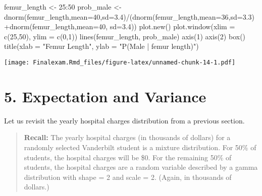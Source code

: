 \documentclass[
]{article}
\newenvironment{Shaded}{\begin{snugshade}}{\end{snugshade}}
\newcommand{\AttributeTok}[1]{\textcolor[rgb]{0.77,0.63,0.00}{#1}}
\newcommand{\DecValTok}[1]{\textcolor[rgb]{0.00,0.00,0.81}{#1}}
\newcommand{\FloatTok}[1]{\textcolor[rgb]{0.00,0.00,0.81}{#1}}
\newcommand{\FunctionTok}[1]{\textcolor[rgb]{0.00,0.00,0.00}{#1}}
\newcommand{\NormalTok}[1]{#1}
\newcommand{\OtherTok}[1]{\textcolor[rgb]{0.56,0.35,0.01}{#1}}
\newcommand{\SpecialCharTok}[1]{\textcolor[rgb]{0.00,0.00,0.00}{#1}}
\newcommand{\StringTok}[1]{\textcolor[rgb]{0.31,0.60,0.02}{#1}}
\begin{document}
\begin{Shaded}
\begin{Highlighting}[]
\NormalTok{femur\_length }\OtherTok{\textless{}{-}} \DecValTok{25}\SpecialCharTok{:}\DecValTok{50}
\NormalTok{prob\_male }\OtherTok{\textless{}{-}} \FunctionTok{dnorm}\NormalTok{(femur\_length,}\AttributeTok{mean=}\DecValTok{40}\NormalTok{,}\AttributeTok{sd=}\FloatTok{3.4}\NormalTok{)}\SpecialCharTok{/}\NormalTok{(}\FunctionTok{dnorm}\NormalTok{(femur\_length,}\AttributeTok{mean=}\DecValTok{36}\NormalTok{,}\AttributeTok{sd=}\FloatTok{3.3}\NormalTok{)}\SpecialCharTok{+}\FunctionTok{dnorm}\NormalTok{(femur\_length,}\AttributeTok{mean=}\DecValTok{40}\NormalTok{, }\AttributeTok{sd=}\FloatTok{3.4}\NormalTok{))}
\FunctionTok{plot.new}\NormalTok{()}
\FunctionTok{plot.window}\NormalTok{(}\AttributeTok{xlim =} \FunctionTok{c}\NormalTok{(}\DecValTok{25}\NormalTok{,}\DecValTok{50}\NormalTok{), }\AttributeTok{ylim =} \FunctionTok{c}\NormalTok{(}\DecValTok{0}\NormalTok{,}\DecValTok{1}\NormalTok{))}
\FunctionTok{lines}\NormalTok{(femur\_length, prob\_male)}
\FunctionTok{axis}\NormalTok{(}\DecValTok{1}\NormalTok{)}
\FunctionTok{axis}\NormalTok{(}\DecValTok{2}\NormalTok{)}
\FunctionTok{box}\NormalTok{()}
\FunctionTok{title}\NormalTok{(}\AttributeTok{xlab =} \StringTok{"Femur Length"}\NormalTok{, }\AttributeTok{ylab =} \StringTok{"P(Male | femur length)"}\NormalTok{)}
\end{Highlighting}
\end{Shaded}

\texttt{[image: Finalexam.Rmd\_files/figure-latex/unnamed-chunk-14-1.pdf]}

\hypertarget{expectation-and-variance}{%
\section{5. Expectation and Variance}\label{expectation-and-variance}}

Let us revisit the yearly hospital charges distribution from a previous
section.

\begin{quote}
\textbf{Recall:} The yearly hospital charges (in thousands of dollars)
for a randomly selected Vanderbilt student is a mixture distribution.
For 50\% of students, the hospital charges will be \$0. For the
remaining 50\% of students, the hospital charges are a random variable
described by a gamma distribution with shape = 2 and scale = 2. (Again,
in thousands of dollars.)
\end{quote}
\end{document}
